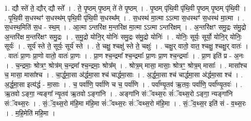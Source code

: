 \documentclass[17pt]{extarticle}
\begin{document}
1. द्यौ स्ते॑ ते॒ द्यौर् द्यौ स्ते᳚ । . ते॒ पृ॒ष्ठम् पृ॒ष्ठम् ते॑ ते पृ॒ष्ठम् । . पृ॒ष्ठम् पृ॑थि॒वी पृ॑थि॒वी पृ॒ष्ठम् पृ॒ष्ठम् पृ॑थि॒वी । . पृ॒थि॒वी स॒धस्थꣳ॑ स॒धस्थ॑म् पृथि॒वी पृ॑थि॒वी स॒धस्थ᳚म् । . स॒धस्थ॑ मा॒त्मा ऽऽत्मा स॒धस्थꣳ॑ स॒धस्थ॑ मा॒त्मा । . स॒धस्थ॒मिति॑ स॒ध - स्थ॒म् । . आ॒त्मा ऽन्तरि॑क्ष म॒न्तरि॑क्ष मा॒त्मा ऽऽत्मा ऽन्तरि॑क्षम् । . अ॒न्तरि॑क्षꣳ समु॒द्रः स॑मु॒द्रो अ॒न्तरि॑क्ष म॒न्तरि॑क्षꣳ समु॒द्रः । . स॒मु॒द्रो योनि॒र् योनिः॑ समु॒द्रः स॑मु॒द्रो योनिः॑ । . योनिः॒ सूर्यः॒ सूर्यो॒ योनि॒र् योनिः॒ सूर्यः॑ । . सूर्य॑ स्ते ते॒ सूर्यः॒ सूर्य॑ स्ते । . ते॒ चक्षु॒ श्चक्षु॑ स्ते ते॒ चक्षुः॑ । . चक्षु॒र् वातो॒ वात॒ श्चक्षु॒ श्चक्षु॒र् वातः॑ । . वातः॑ प्रा॒णः प्रा॒णो वातो॒ वातः॑ प्रा॒णः । . प्रा॒ण श्च॒न्द्रमा᳚ श्च॒न्द्रमाः᳚ प्रा॒णः प्रा॒ण श्च॒न्द्रमाः᳚ । . प्रा॒ण इति॑ प्र - अ॒नः । . च॒न्द्रमाः॒ श्रोत्रꣳ॒॒ श्रोत्र॑म् च॒न्द्रमा᳚ श्च॒न्द्रमाः॒ श्रोत्र᳚म् । . श्रोत्र॒म् मासा॒ मासाः॒ श्रोत्रꣳ॒॒ श्रोत्र॒म् मासाः᳚ । . मासा᳚श्च च॒ मासा॒ मासा᳚श्च । . चा॒र्द्ध॒मा॒सा अ॑र्द्धमा॒सा श्च॑ चार्द्धमा॒साः । . अ॒र्द्ध॒मा॒सा श्च॑ चार्द्धमा॒सा अ॑र्द्धमा॒सा श्च॑ । . अ॒र्द्ध॒मा॒सा इत्य॑र्द्ध - मा॒साः । . च॒ पर्वा॑णि॒ पर्वा॑णि च च॒ पर्वा॑णि । . पर्वा᳚ण्यृ॒तव॑ ऋ॒तवः॒ पर्वा॑णि॒ पर्वा᳚ण्यृ॒तवः॑ । . ऋ॒तवो ऽङ्गा॒ न्यङ्गा᳚ न्यृ॒तव॑ ऋ॒तवो ऽङ्गा॑नि । . अङ्गा॑नि संॅवथ्स॒रः सं॑ॅवथ्स॒रो ऽङ्गा॒ न्यङ्गा॑नि संॅवथ्स॒रः । . सं॒ॅव॒थ्स॒रो म॑हि॒मा म॑हि॒मा सं॑ॅवथ्स॒रः सं॑ॅवथ्स॒रो म॑हि॒मा । . सं॒ॅव॒थ्स॒र इति॑ सं - व॒थ्स॒रः । . म॒हि॒मेति॑ महि॒मा । \newline
\end{document}
